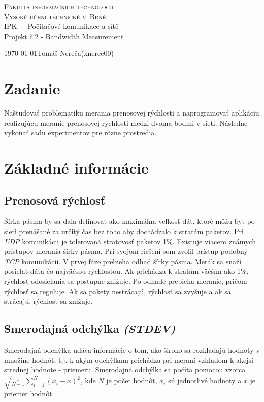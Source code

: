 \documentclass[a4paper, 11pt]{article}
\begin{document}
	\sloppy
\begin{titlepage}
\begin{center}
	
	\textsc{\Huge Fakulta informačních technologií\\[3.5mm]
			Vysoké učení technické v~Brně}
	\\[79mm]
	{\LARGE IPK \,--\, Počítačové komunikace a sítě\\[1.5mm]
	Projekt č.2 - Bandwidth Measurement}
	\vfill
\end{center}
{\Large \today \hfill Tomáš Nereča(xnerec00)}
\\[-4mm]
\end{titlepage}
\tableofcontents
\thispagestyle{empty}
\newpage

\section{Zadanie}
Naštudovať problematiku merania prenosovej rýchlosti a naprogramovať aplikáciu realizujúcu meranie prenosovej rýchlosti medzi dvoma bodmi v sieti. Následne vykonať sadu experimentov pre rôzne prostredia.

\section{Základné informácie}
\subsection{Prenosová rýchlosť}
Šírka pásma by sa dala definovať ako maximálna veľkosť dát, ktoré môžu byť po sieti prenášané za určitý čas bez toho aby dochádzalo k stratám paketov. Pri \emph{UDP} komunikácii je tolerovaná stratovosť paketov 1\%. 
Existuje viacero známych prístupov merania šírky pásma. Pri svojom riešení som zvolil prístup podobný \emph{TCP} komunikácii. V prvej fáze prebieha odhad šírky pásma. Merák sa snaží posielať dáta čo najväčsou rýchlosťou. Ak prichádza k stratám väčším ako 1\%, rýchlosť odosielania sa postupne znižuje. Po odhade prebieha meranie, pričom rýchlosť sa reguluje. Ak sa pakety nestrácajú, rýchlosť sa zvyšuje a ak sa strácajú, rýchlosť sa znižuje.

\subsection{Smerodajná odchýlka \emph{(STDEV)}}
Smerodajná odchýlka udáva informácie o tom, ako široko sa rozkladajú hodnoty v množine hodnôt, t.j. k akým odchýlkam prichádza pri meraní vzhľadom k akejsi strednej hodnote - priemeru. Smerodajná odchýlka sa počíta pomocou vzorca $\sqrt{\frac{1}{N - 1} \sum\limits_{i=1}^{N} (x_i - \overline{x})^2}$, kde $N$ je počet hodnôt, $x_i$ sú jednotlivé hodnoty a $\overline{x}$ je priemer hodnôt.
\end{document}
